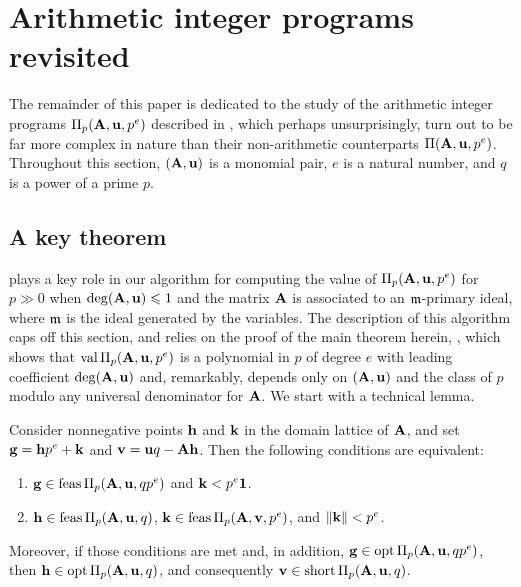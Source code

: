 \documentclass{amsart}
\begin{document}
\section{Arithmetic integer programs revisited}

The remainder of this paper is dedicated to the study of the arithmetic integer programs $\Pi_p(\mathbf{A}, \mathbf{u}, p^e)$ described in , which perhaps unsurprisingly, turn out to be far more complex in nature than their non-arithmetic counterparts $\Pi(\mathbf{A}, \mathbf{u}, p^e)$.
Throughout this section, $(\mathbf{A},\mathbf{u})$ is a monomial pair, $e$ is a natural number, and $q$ is a power of a prime $p$.

\subsection{A key theorem}
 plays a key role in our algorithm for computing the value of $\Pi_p(\mathbf{A}, \mathbf{u}, p^e)$ for $p \gg 0$ when $\operatorname{deg}(\mathbf{A},\mathbf{u}) \leqslant 1$ and the matrix $\mathbf{A}$ is associated to an $\mathfrak{m}$-primary ideal, where $\mathfrak{m}$ is the ideal generated by the variables.
The description of this algorithm caps off this section, and relies on the proof of the main theorem herein, , which shows that $\operatorname{val} \Pi_p(\mathbf{A}, \mathbf{u}, p^e)$ is a polynomial in $p$ of degree $e$ with leading coefficient $\operatorname{deg}(\mathbf{A},\mathbf{u})$ and, remarkably, depends only on $(\mathbf{A},\mathbf{u})$ and the class of $p$ modulo any universal denominator for $\mathbf{A}$.
We start with a technical lemma.

\begin{lemma}
   \label{general AIP prep: L}
   Consider nonnegative points $\mathbf{h}$ and $\mathbf{k}$ in the domain lattice of $\mathbf{A}$, and set $\mathbf{g} = \mathbf{h} p^e + \mathbf{k}$ and $\mathbf{v} = \mathbf{u}q - \mathbf{A}\mathbf{h}$.
   Then the following conditions are equivalent\textup:
   \begin{enumerate}[$(1)$]
      \item $\mathbf{g} \in \operatorname{feas} \Pi_p(\mathbf{A},\mathbf{u},qp^e)$ and $\mathbf{k} < p^e \mathbf{1}$.
      \item $\mathbf{h} \in \operatorname{feas} \Pi_p(\mathbf{A},\mathbf{u},q)$, $\mathbf{k} \in \operatorname{feas} \Pi_p(\mathbf{A},\mathbf{v},p^e)$, and $\| \mathbf{k} \| < p^e$.
   \end{enumerate}
   Moreover, if those conditions are met and, in addition, $\mathbf{g}\in \operatorname{opt} \Pi_p(\mathbf{A},\mathbf{u},qp^e)$, then $\mathbf{h} \in \operatorname{opt} \Pi_p(\mathbf{A},\mathbf{u},q)$, and consequently $\mathbf{v} \in \operatorname{short} \Pi_p(\mathbf{A},\mathbf{u},q)$.
\end{lemma}
\end{document}
